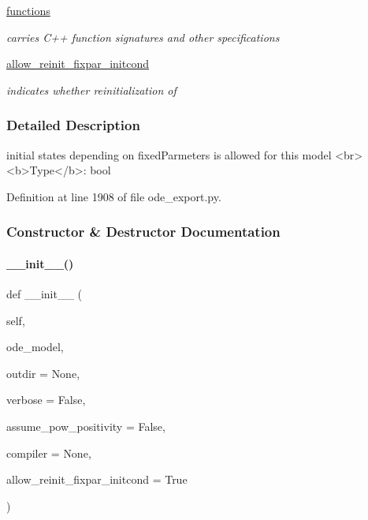 \begin{DoxyCompactItemize}
\mbox{\hyperlink{classamici_1_1ode__export_1_1_o_d_e_exporter_a2cb6c540c07a402759bab624703ecdb2}{functions}}
\begin{DoxyCompactList}\small\item\em carries C++ function signatures and other specifications \end{DoxyCompactList}\item 
\mbox{\label{classamici_1_1ode__export_1_1_o_d_e_exporter_a50ba58e6df269149d17dda632a15620a}} 
\mbox{\hyperlink{classamici_1_1ode__export_1_1_o_d_e_exporter_a50ba58e6df269149d17dda632a15620a}{allow\+\_\+reinit\+\_\+fixpar\+\_\+initcond}}
\begin{DoxyCompactList}\small\item\em indicates whether reinitialization of \end{DoxyCompactList}\end{DoxyCompactItemize}


\subsubsection{Detailed Description}
\begin{DoxyVerb}    initial states depending on fixedParmeters is allowed for this model
    <br><b>Type</b>: bool
\end{DoxyVerb}
 

Definition at line 1908 of file ode\+\_\+export.\+py.



\subsubsection{Constructor \& Destructor Documentation}
\mbox{\label{classamici_1_1ode__export_1_1_o_d_e_exporter_ade5a56f9eda68f70b441b904113d766b}} 
\paragraph{\texorpdfstring{\_\_init\_\_()}{\_\_init\_\_()}}
{\footnotesize\ttfamily def \+\_\+\+\_\+init\+\_\+\+\_\+ (\begin{DoxyParamCaption}\item[{}]{self,  }\item[{}]{ode\+\_\+model,  }\item[{}]{outdir = {\ttfamily None},  }\item[{}]{verbose = {\ttfamily False},  }\item[{}]{assume\+\_\+pow\+\_\+positivity = {\ttfamily False},  }\item[{}]{compiler = {\ttfamily None},  }\item[{}]{allow\+\_\+reinit\+\_\+fixpar\+\_\+initcond = {\ttfamily True} }\end{DoxyParamCaption})}


